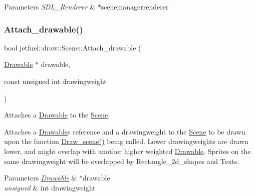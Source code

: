 \begin{DoxyParams}{Parameters}
{\em S\+D\+L\+\_\+\+Renderer} & $\ast$scenemanagerrenderer \\
\hline
\end{DoxyParams}
\mbox{\label{classjetfuel_1_1draw_1_1Scene_aea4b4c4ae25c30d661be4c52787e0ea3}} 
\subsubsection{\texorpdfstring{Attach\+\_\+drawable()}{Attach\_drawable()}}
{\footnotesize\ttfamily bool jetfuel\+::draw\+::\+Scene\+::\+Attach\+\_\+drawable (\begin{DoxyParamCaption}\item[{\hyperlink{classjetfuel_1_1draw_1_1Drawable}{Drawable} $\ast$}]{drawable,  }\item[{const unsigned int}]{drawingweight }\end{DoxyParamCaption})}



Attaches a \hyperlink{classjetfuel_1_1draw_1_1Drawable}{Drawable} to the \hyperlink{classjetfuel_1_1draw_1_1Scene}{Scene}. 

Attaches a \hyperlink{classjetfuel_1_1draw_1_1Drawable}{Drawable}\textquotesingle{}s reference and a drawingweight to the \hyperlink{classjetfuel_1_1draw_1_1Scene}{Scene} to be drawn upon the function \hyperlink{classjetfuel_1_1draw_1_1Scene_a80b9b5f38022b6c2af9921656f93056b}{Draw\+\_\+scene()} being called. Lower drawingweights are drawn lower, and might overlap with another higher weighted \hyperlink{classjetfuel_1_1draw_1_1Drawable}{Drawable}. Sprites on the same drawingweight will be overlapped by Rectangle\+\_\+2d\+\_\+shapes and Texts.


\begin{DoxyParams}{Parameters}
{\em \hyperlink{classjetfuel_1_1draw_1_1Drawable}{Drawable}} & $\ast$drawable \\
\hline
{\em unsigned} & int drawingweight \\
\hline
\end{DoxyParams}
\mbox{\label{classjetfuel_1_1draw_1_1Scene_ab7bf5496c18d4a00e0b5ce02a203a4b4}} 
